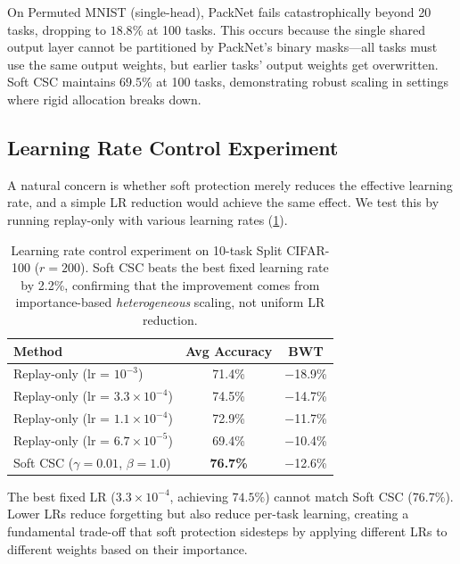 \documentclass[11pt]{article}
\begin{document}
On Permuted MNIST (single-head), PackNet fails catastrophically beyond 20 tasks, dropping to $18.8\%$ at 100 tasks.
This occurs because the single shared output layer cannot be partitioned by PackNet's binary masks---all tasks must use the same output weights, but earlier tasks' output weights get overwritten.
Soft CSC maintains $69.5\%$ at 100 tasks, demonstrating robust scaling in settings where rigid allocation breaks down.

\subsection{Learning Rate Control Experiment}
\label{sec:lr_control}

A natural concern is whether soft protection merely reduces the effective learning rate, and a simple LR reduction would achieve the same effect.
We test this by running replay-only with various learning rates (\cref{tab:lr_control}).

\begin{table}[t]
\centering
\caption{Learning rate control experiment on 10-task Split CIFAR-100 ($r=200$). Soft CSC beats the best fixed learning rate by 2.2\%, confirming that the improvement comes from importance-based \textit{heterogeneous} scaling, not uniform LR reduction.}
\label{tab:lr_control}
\small
\begin{tabular}{lcc}
\toprule
\textbf{Method} & \textbf{Avg Accuracy} & \textbf{BWT} \\
\midrule
Replay-only (lr = $10^{-3}$) & 71.4\% & $-$18.9\% \\
Replay-only (lr = $3.3 \times 10^{-4}$) & 74.5\% & $-$14.7\% \\
Replay-only (lr = $1.1 \times 10^{-4}$) & 72.9\% & $-$11.7\% \\
Replay-only (lr = $6.7 \times 10^{-5}$) & 69.4\% & $-$10.4\% \\
\midrule
Soft CSC ($\gamma=0.01$, $\beta=1.0$) & \textbf{76.7\%} & $-$12.6\% \\
\bottomrule
\end{tabular}
\end{table}

The best fixed LR ($3.3 \times 10^{-4}$, achieving $74.5\%$) cannot match Soft CSC ($76.7\%$).
Lower LRs reduce forgetting but also reduce per-task learning, creating a fundamental trade-off that soft protection sidesteps by applying different LRs to different weights based on their importance.

\end{document}
